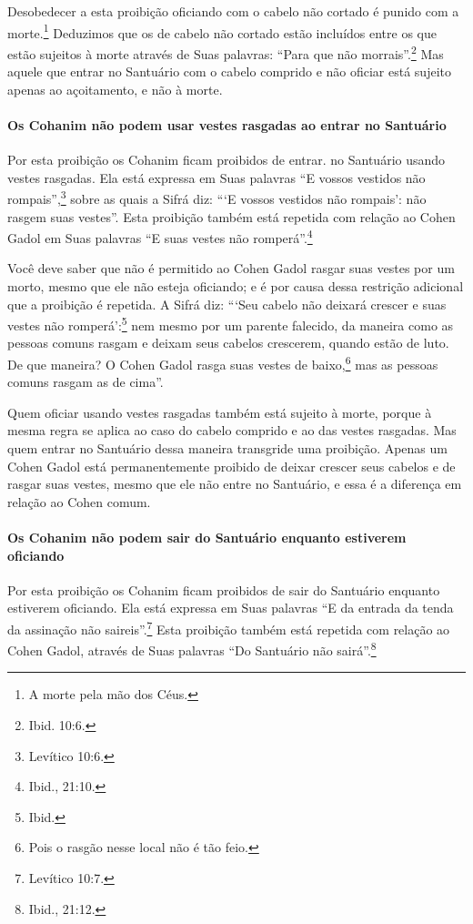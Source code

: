 Desobedecer a esta proibição oficiando com o cabelo não cortado é punido
com a morte.\footnote{A morte pela mão dos Céus.} Deduzimos que os de cabelo não
cortado estão incluídos entre os que estão sujeitos à morte através de
Suas palavras: ``Para que não morrais''.\footnote{Ibid. 10:6.} Mas aquele que
entrar no Santuário com o cabelo comprido e não oficiar está sujeito
apenas ao açoitamento, e não à morte.

\paragraph{Os Cohanim não podem usar vestes rasgadas ao entrar no Santuário}

Por esta proibição os Cohanim ficam proibidos de entrar. no
Santuário usando vestes rasgadas. Ela está expressa em Suas palavras ``E
vossos vestidos não rompais'',\footnote{Levítico 10:6.} sobre as quais a Sifrá
diz: ```E vossos vestidos não rompais': não rasgem suas vestes''. Esta
proibição também está repetida com relação ao Cohen Gadol em Suas
palavras ``E suas vestes não romperá''.\footnote{Ibid., 21:10.}

Você deve saber que não é permitido ao Cohen Gadol rasgar suas
vestes por um morto, mesmo que ele não esteja oficiando; e é por causa
dessa restrição adicional que a proibição é repetida. A Sifrá diz:
```Seu cabelo não deixará crescer e suas vestes não romperá':\footnote{Ibid.} nem mesmo por um
parente falecido, da maneira como as pessoas comuns rasgam e deixam seus
cabelos crescerem, quando estão de luto. De que maneira? O Cohen
Gadol rasga suas vestes de baixo,\footnote{Pois o rasgão nesse local não é tão feio.} mas as pessoas comuns rasgam as de cima''.

Quem oficiar usando vestes rasgadas também está sujeito à morte, porque
à mesma regra se aplica ao caso do cabelo comprido e ao das vestes
rasgadas. Mas quem entrar no Santuário dessa maneira transgride uma
proibição. Apenas um Cohen Gadol está permanentemente proibido de
deixar crescer seus cabelos e de rasgar suas vestes, mesmo que ele não
entre no Santuário, e essa é a diferença em relação ao Cohen comum.

\paragraph{Os Cohanim não podem sair do Santuário enquanto estiverem oficiando}

Por esta proibição os Cohanim ficam proibidos de sair do Santuário
enquanto estiverem oficiando. Ela está expressa em Suas palavras ``E da
entrada da tenda da assinação não saireis''.\footnote{Levítico 10:7.} Esta
proibição também está repetida com relação ao Cohen Gadol, através
de Suas palavras ``Do Santuário não sairá''.\footnote{Ibid., 21:12.}

